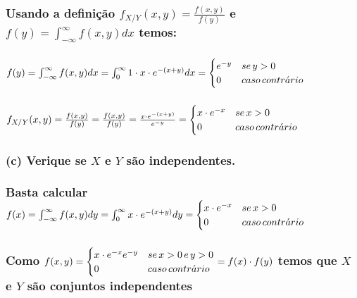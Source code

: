 \documentclass[portuguese]{article}
\begin{document}
\subsubsection*{\textmd{Usando a definição $f_{X/Y}(x,y)=\frac{f(x,y)}{f(y)}$ e
$f(y)=\int_{-\infty}^{\infty}f(x,y)dx$ temos:}}


\subsubsection*{\textmd{$f(y)=\int_{-\infty}^{\infty}f(x,y)dx=\int_{0}^{\infty}1\cdot x\cdot e^{-(x+y)}dx=\protect\begin{cases}
e^{-y} & se\, y>0\protect\\
0 & caso\, contr\acute{a}rio
\protect\end{cases}$}}


\subsubsection*{$f_{X/Y}(x,y)=\frac{f(x,y)}{f(y)}=\frac{f(x,y)}{f(y)}=\frac{x\cdot e^{-(x+y)}}{e^{-y}}=\protect\begin{cases}
x\cdot e^{-x} & se\, x>0\protect\\
0 & caso\, contr\acute{a}rio
\protect\end{cases}$}


\subsubsection*{\textmd{(c) Verique se $X$ e $Y$ são independentes.}}


\subsubsection*{\textmd{Basta calcular $f(x)=\int_{-\infty}^{\infty}f(x,y)dy=\int_{0}^{\infty}x\cdot e^{-(x+y)}dy=\protect\begin{cases}
x\cdot e^{-x} & se\, x>0\protect\\
0 & caso\, contr\acute{a}rio
\protect\end{cases}$}}


\subsubsection*{\textmd{Como $f(x,y)=\protect\begin{cases}
x\cdot e^{-x}e^{-y} & se\, x>0\, e\, y>0\protect\\
0 & caso\, contr\acute{a}rio
\protect\end{cases}=f(x)\cdot f(y)$ temos que $X$ e $Y$ são conjuntos independentes}}
\end{document}
